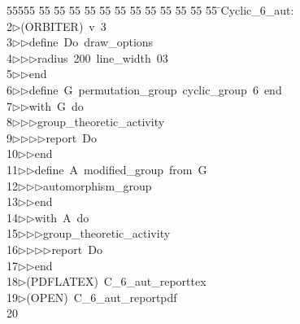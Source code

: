 %
%
\begin{tabbing}
55555 \= 55 \= 55 \= 55 \= 55 \= 55 \= 55 \= 55 \= 55 \= 55 \= 55 \= 55 \= 55 \= \>Cyclic\_6\_aut:\\[0pt]
2\>$\triangleright$\>(ORBITER)\ v\ 3\ \\[0pt]
3\>$\triangleright$\>$\triangleright$\>define\ Do\ draw\_options\ \\[0pt]
4\>$\triangleright$\>$\triangleright$\>$\triangleright$\>radius\ 200\ line\_width\ 03\ \\[0pt]
5\>$\triangleright$\>$\triangleright$\>end\ \\[0pt]
6\>$\triangleright$\>$\triangleright$\>define\ G\ permutation\_group\ cyclic\_group\ 6\ end\ \\[0pt]
7\>$\triangleright$\>$\triangleright$\>with\ G\ do\ \\[0pt]
8\>$\triangleright$\>$\triangleright$\>$\triangleright$\>group\_theoretic\_activity\ \\[0pt]
9\>$\triangleright$\>$\triangleright$\>$\triangleright$\>$\triangleright$\>report\ Do\ \\[0pt]
10\>$\triangleright$\>$\triangleright$\>end\ \\[0pt]
11\>$\triangleright$\>$\triangleright$\>define\ A\ modified\_group\ from\ G\ \\[0pt]
12\>$\triangleright$\>$\triangleright$\>$\triangleright$\>automorphism\_group\ \\[0pt]
13\>$\triangleright$\>$\triangleright$\>end\ \\[0pt]
14\>$\triangleright$\>$\triangleright$\>with\ A\ do\ \\[0pt]
15\>$\triangleright$\>$\triangleright$\>$\triangleright$\>group\_theoretic\_activity\ \\[0pt]
16\>$\triangleright$\>$\triangleright$\>$\triangleright$\>$\triangleright$\>report\ Do\ \\[0pt]
17\>$\triangleright$\>$\triangleright$\>end\\[0pt]
18\>$\triangleright$\>(PDFLATEX)\ C\_6\_aut\_reporttex\\[0pt]
19\>$\triangleright$\>(OPEN)\ C\_6\_aut\_reportpdf\\[0pt]
20\>\end{tabbing}
